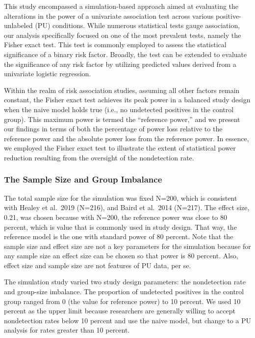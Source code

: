 \documentclass[
]{article}
\begin{document}
This study encompassed a simulation-based approach aimed at evaluating
the alterations in the power of a univariate association test across
various positive-unlabeled (PU) conditions. While numerous statistical
tests gauge association, our analysis specifically focused on one of the
most prevalent tests, namely the Fisher exact test. This test is
commonly employed to assess the statistical significance of a binary
risk factor. Broadly, the test can be extended to evaluate the
significance of any risk factor by utilizing predicted values derived
from a univariate logistic regression.

Within the realm of risk association studies, assuming all other factors
remain constant, the Fisher exact test achieves its peak power in a
balanced study design when the naive model holds true (i.e., no
undetected positives in the control group). This maximum power is termed
the ``reference power,'' and we present our findings in terms of both
the percentage of power loss relative to the reference power and the
absolute power loss from the reference power. In essence, we employed
the Fisher exact test to illustrate the extent of statistical power
reduction resulting from the oversight of the nondetection rate.

\hypertarget{the-sample-size-and-group-imbalance}{%
\subsubsection{The Sample Size and Group
Imbalance}\label{the-sample-size-and-group-imbalance}}

The total sample size for the simulation was fixed N=200, which is
consistent with Healey et al.~2019 (N=216), and Baird et al.~2014
(N=217). \cite{bcioa14} \cite{hmhcbhkr19} The effect size, 0.21, was
chosen because with N=200, the reference power was close to 80 percent,
which is value that is commonly used in study design. That way, the
reference model is the one with standard power of 80 percent. Note that
the sample size and effect size are not a key parameters for the
simulation because for any sample size an effect size can be chosen so
that power is 80 percent. Also, effect size and sample size are not
features of PU data, per se.

The simulation study varied two study design parameters: the
nondetection rate and group-size imbalance. The proportion of undetected
positives in the control group ranged from 0 (the value for reference
power) to 10 percent. We used 10 percent as the upper limit because
researchers are generally willing to accept nondetection rates below 10
percent and use the naive model, but change to a PU analysis for rates
greater than 10 percent. \cite{bd20}
\end{document}
